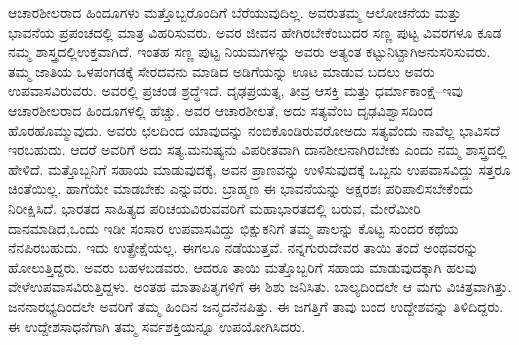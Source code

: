 ಆಚಾರಶೀಲರಾದ ಹಿಂದೂಗಳು ಮತ್ತೊಬ್ಬರೊಂದಿಗೆ ಬೆರೆಯುವುದಿಲ್ಲ. ಅವರು\break ತಮ್ಮ ಆಲೋಚನೆಯ ಮತ್ತು ಭಾವನೆಯ ಪ್ರಪಂಚದಲ್ಲಿ ಮಾತ್ರ ವಿಹರಿಸುವರು. ಅವರ ಜೀವನ ಹೇಗಿರಬೇಕೆಂಬುದರ ಸಣ್ಣ ಪುಟ್ಟ ವಿವರಗಳೂ ಕೂಡ ನಮ್ಮ ಶಾಸ್ತ್ರದಲ್ಲಿ\break ಉಕ್ತವಾಗಿದೆ. ಇಂತಹ ಸಣ್ಣ ಪುಟ್ಟ ನಿಯಮಗಳನ್ನು ಅವರು ಅತ್ಯಂತ ಕಟ್ಟುನಿಟ್ಟಾಗಿ\break ಅನುಸರಿಸುವರು. ತಮ್ಮ ಜಾತಿಯ ಒಳಪಂಗಡಕ್ಕೆ ಸೇರದವನು ಮಾಡಿದ ಅಡಿಗೆಯನ್ನು ಊಟ ಮಾಡುವ ಬದಲು ಅವರು ಉಪವಾಸವಿರುವರು. ಅವರಲ್ಲಿ ಪ್ರಚಂಡ ಶ್ರದ್ಧೆ\break ಇದೆ. ದೃಢಪ್ರಯತ್ನ, ತೀವ್ರ ಆಸಕ್ತಿ ಮತ್ತು ಧರ್ಮಾಕಾಂಕ್ಷೆ–ಇವು ಆಚಾರಶೀಲರಾದ ಹಿಂದೂಗಳಲ್ಲಿ ಹೆಚ್ಚು. ಅವರ ಆಚಾರಶೀಲತೆ, ಅದು ಸತ್ಯವೆಂಬ ದೃಢವಿಶ್ವಾಸದಿಂದ ಹೊರಹೊಮ್ಮುವುದು. ಅವರು ಛಲದಿಂದ ಯಾವುದನ್ನು ನಂಬಿಕೊಂಡಿರುವರೋ\break ಅದು ಸತ್ಯವೆಂದು ನಾವೆಲ್ಲ ಭಾವಿಸದೆ ಇರಬಹುದು. ಆದರೆ ಅವರಿಗೆ ಅದು ಸತ್ಯ.\break ಮನುಷ್ಯನು ವಿಪರೀತವಾಗಿ ದಾನಶೀಲನಾಗಿರಬೇಕು ಎಂದು ನಮ್ಮ ಶಾಸ್ತ್ರದಲ್ಲಿ ಹೇಳಿದೆ. ಮತ್ತೊಬ್ಬನಿಗೆ ಸಹಾಯ ಮಾಡುವುದಕ್ಕೆ, ಅವನ ಪ್ರಾಣವನ್ನು ಉಳಿಸುವುದಕ್ಕೆ ಒಬ್ಬನು ಉಪವಾಸವಿದ್ದು ಸತ್ತರೂ ಚಿಂತೆಯಿಲ್ಲ. ಹಾಗೆಯೇ ಮಾಡಬೇಕು ಎನ್ನುವರು. ಬ್ರಾಹ್ಮಣ ಈ ಭಾವನೆಯನ್ನು ಅಕ್ಷರಶಃ ಪರಿಪಾಲಿಸಬೇಕೆಂದು ನಿರೀಕ್ಷಿಸಿದೆ. ಭಾರತದ ಸಾಹಿತ್ಯದ ಪರಿಚಯವಿರುವವರಿಗೆ ಮಹಾಭಾರತದಲ್ಲಿ ಬರುವ, ಮೇರೆಮೀರಿ ದಾನಮಾಡಿದ,\break ಒಂದು ಇಡೀ ಸಂಸಾರ ಉಪವಾಸವಿದ್ದು ಭಿಕ್ಷುಕನಿಗೆ ತಮ್ಮ ಪಾಲನ್ನು ಕೊಟ್ಟ ಸುಂದರ ಕಥೆಯ ನೆನಪಿರಬಹುದು. ಇದು ಉತ್ಪ್ರೇಕ್ಷೆಯಲ್ಲ. ಈಗಲೂ ನಡೆಯುತ್ತವೆ. ನನ್ನ\break ಗುರುದೇವರ ತಾಯಿ ತಂದೆ ಅಂಥವರನ್ನು ಹೋಲುತ್ತಿದ್ದರು. ಅವರು ಬಹಳ\break ಬಡವರು. ಆದರೂ ತಾಯಿ ಮತ್ತೊಬ್ಬರಿಗೆ ಸಹಾಯ ಮಾಡುವುದಕ್ಕಾಗಿ ಹಲವು ವೇಳೆ\break ಉಪವಾಸವಿರುತ್ತಿದ್ದಳು. ಅಂತಹ ಮಾತಾಪಿತೃಗಳಿಗೆ ಈ ಶಿಶು ಜನಿಸಿತು. ಬಾಲ್ಯದಿಂದಲೇ ಆ ಮಗು ವಿಚಿತ್ರವಾಗಿತ್ತು. ಜನನಾರಭ್ಯದಿಂದಲೇ ಅವರಿಗೆ ತಮ್ಮ ಹಿಂದಿನ ಜನ್ಮದ\break ನೆನಪಿತ್ತು. ಈ ಜಗತ್ತಿಗೆ ತಾವು ಬಂದ ಉದ್ದೇಶವನ್ನು ತಿಳಿದಿದ್ದರು. ಈ ಉದ್ದೇಶ\break ಸಾಧನೆಗಾಗಿ ತಮ್ಮ ಸರ್ವಶಕ್ತಿಯನ್ನೂ ಉಪಯೋಗಿಸಿದರು.

